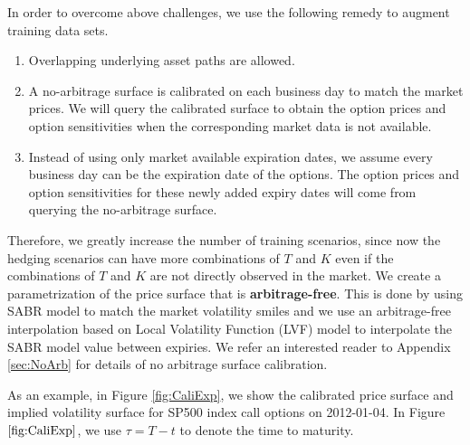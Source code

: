 \documentclass[letterpaper,12pt,titlepage,oneside,final]{book}
\numberwithin{equation}{section}
\theoremstyle{definition}
\begin{document}
In order to overcome  above challenges, we use the following remedy to augment training data sets.  
\begin{enumerate}
	\item Overlapping underlying asset paths are allowed.
	\item A no-arbitrage  surface is calibrated on each business day to match the market prices. We will query the calibrated surface to obtain the option prices and option sensitivities when the corresponding market data is not available. 
	\item Instead of using only market available expiration dates, we assume every business day can be the expiration date of the options. The option prices and option sensitivities for these newly added expiry dates will come from querying the no-arbitrage  surface.
\end{enumerate}


Therefore, we greatly increase the number of training scenarios, since now the hedging scenarios can have more combinations of $T$ and $K$ even if the combinations of $T$ and $K$ are not directly observed in the market. 
We create a parametrization of the price surface that is \textbf{arbitrage-free}.  This is done by using SABR model to match the market volatility smiles and we use an arbitrage-free interpolation based on Local Volatility Function (LVF) model to interpolate the SABR model value between expiries. We refer an interested reader to Appendix \ref{sec:NoArb} for details of no arbitrage surface calibration.


As an example, in Figure \ref{fig:CaliExp}, we show the calibrated price surface and implied  volatility surface for SP500 index call options  on 2012-01-04. In Figure $\ref{fig:CaliExp}$, we use $\tau=T-t$ to denote the time to maturity.  
\end{document}
